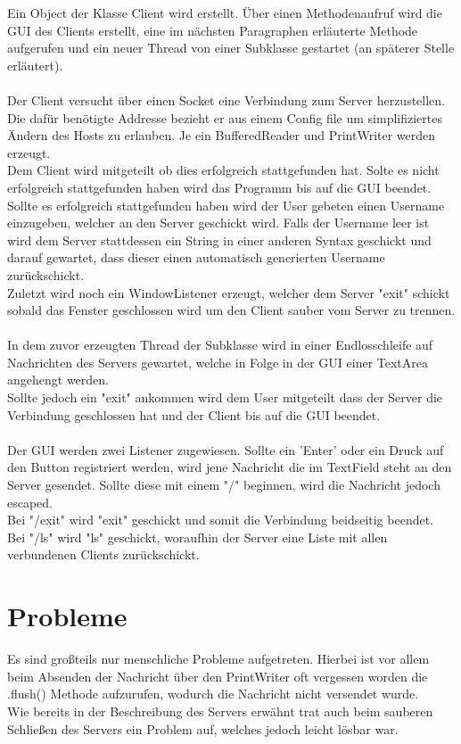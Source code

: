 \documentclass{article}
\begin{document}
Ein Object der Klasse Client wird erstellt. Über einen Methodenaufruf wird die GUI des Clients erstellt, eine im nächsten Paragraphen erläuterte Methode aufgerufen und ein neuer Thread von einer Subklasse gestartet (an späterer Stelle erläutert).\\
\\
Der Client versucht über einen Socket eine Verbindung zum Server herzustellen. Die dafür benötigte Addresse bezieht er aus einem Config file um simplifiziertes Ändern des Hosts zu erlauben. Je ein BufferedReader und PrintWriter werden erzeugt.\\
Dem Client wird mitgeteilt ob dies erfolgreich stattgefunden hat. Solte es nicht erfolgreich stattgefunden haben wird das Programm bis auf die GUI beendet.\\
Sollte es erfolgreich stattgefunden haben wird der User gebeten einen Username einzugeben, welcher an den Server geschickt wird. Falls der Username leer ist wird dem Server stattdessen ein String in einer anderen Syntax geschickt und darauf gewartet, dass dieser einen automatisch generierten Username zurückschickt.\\
Zuletzt wird noch ein WindowListener erzeugt, welcher dem Server "exit" schickt sobald das Fenster geschlossen wird um den Client sauber vom Server zu trennen.\\
\\
In dem zuvor erzeugten Thread der Subklasse wird in einer Endlosschleife auf Nachrichten des Servers gewartet, welche in Folge in der GUI einer TextArea angehengt werden.\\
Sollte jedoch ein "exit" ankommen wird dem User mitgeteilt dass der Server die Verbindung geschlossen hat und der Client bis auf die GUI beendet.\\
\\
Der GUI werden zwei Listener zugewiesen. Sollte ein 'Enter' oder ein Druck auf den Button registriert werden, wird jene Nachricht die im TextField steht an den Server gesendet. Sollte diese mit einem "/" beginnen, wird die Nachricht jedoch escaped.\\
Bei "/exit" wird "exit" geschickt und somit die Verbindung beidseitig beendet.\\
Bei "/ls" wird "ls" geschickt, woraufhin der Server eine Liste mit allen verbundenen Clients zurückschickt.


\newpage\section{Probleme}


Es sind großteils nur menschliche Probleme aufgetreten. Hierbei ist vor allem beim Absenden der Nachricht über den PrintWriter oft vergessen worden die .flush() Methode aufzurufen, wodurch die Nachricht nicht versendet wurde.\\
Wie bereits in der Beschreibung des Servers erwähnt trat auch beim sauberen Schließen des Servers ein Problem auf, welches jedoch leicht lösbar war.
\end{document}
